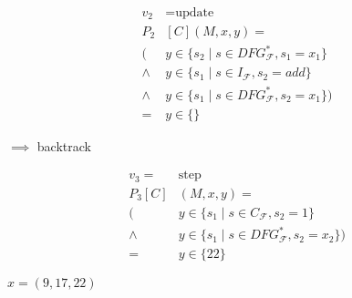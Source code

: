 \begin{minipage}{4.75cm}
    \begin{graybox}
        \footnotesize
        \setlength{\abovedisplayskip}{0pt}
        \setlength{\belowdisplayskip}{0pt}
        \vspace{-0.5em}
        \begin{align*}
            v_2&{}=\text{update}\\
            P_2&{}[C](M,x,y)=\\
              (&y\in\{s_2\mid s\in DFG_\mathcal{F}^*,s_1=x_1\}\\
                \mathrel\land{}&y\in\{s_1\mid s\in I_\mathcal{F},s_2=add\}\\
                \mathrel\land{}&y\in\{s_1\mid s\in DFG_\mathcal{F}^*,s_2=x_1\})\\
               ={}&y\in\{\}
        \end{align*}
    \end{graybox}
    {\large $\implies$ backtrack}
\end{minipage}

\begin{minipage}{5cm}
    \begin{graybox}
        \footnotesize
        \setlength{\abovedisplayskip}{0pt}
        \setlength{\belowdisplayskip}{0pt}
        \vspace{-0.5em}
        \begin{align*}
            v_3={}&\text{step}\\
            P_3[C]&(M,x,y)=\\
              (&y\in\{s_1\mid s\in C_\mathcal{F}, s_2=1\}\\
                \mathrel\land{}&y\in\{s_1\mid s\in DFG_\mathcal{F}^*, s_2=x_2\})\\
               ={}&y\in\{22\}
        \end{align*}
    \end{graybox}
    \vspace{-0.75em}
    \hspace{1cm}
    {\Huge{}}
    \hspace{1cm}
\end{minipage}

{\large \phantom{$(9,17,22)$}$x=(9,17,22)$\phantom{$x$}}
